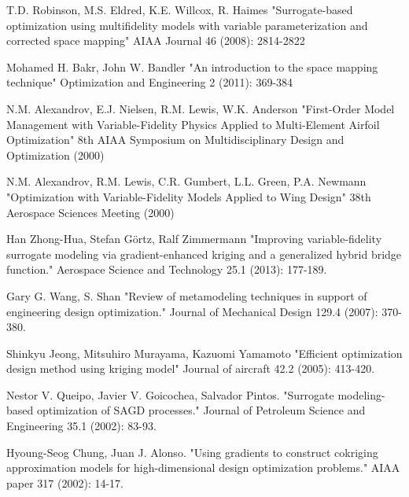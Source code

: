 \documentclass[a4paper,onecolumn]{article}
\theoremstyle{remark}
\begin{document}
\begin{thebibliography}{9}
T.D. Robinson, M.S. Eldred, K.E. Willcox, R. Haimes
"Surrogate-based optimization using multifidelity models with variable 
parameterization and corrected space mapping"
AIAA Journal 46 (2008): 2814-2822

Mohamed H. Bakr, John W. Bandler
"An introduction to the space mapping technique"
Optimization and Engineering 2 (2011): 369-384

N.M. Alexandrov, E.J. Nielsen, R.M. Lewis, W.K. Anderson
"First-Order Model Management with Variable-Fidelity Physics 
Applied to Multi-Element Airfoil Optimization"
8th AIAA Symposium on Multidisciplinary Design and Optimization (2000)


N.M. Alexandrov, R.M. Lewis, C.R. Gumbert, L.L. Green, P.A. Newmann
"Optimization with Variable-Fidelity Models Applied to Wing Design"
38th Aerospace Sciences Meeting (2000)

Han Zhong-Hua, Stefan Görtz, Ralf Zimmermann
"Improving variable-fidelity surrogate modeling via gradient-enhanced kriging and a generalized hybrid bridge function."
Aerospace Science and Technology 25.1 (2013): 177-189.

Gary G. Wang, S. Shan
"Review of metamodeling techniques in support of engineering design optimization."
Journal of Mechanical Design 129.4 (2007): 370-380.

Shinkyu Jeong, Mitsuhiro Murayama, Kazuomi Yamamoto
"Efficient optimization design method using kriging model" 
Journal of aircraft 42.2 (2005): 413-420.

Nestor V. Queipo, Javier V. Goicochea, Salvador Pintos. 
"Surrogate modeling-based optimization of SAGD processes." 
Journal of Petroleum Science and Engineering 35.1 (2002): 83-93.

Hyoung-Seog Chung, Juan J. Alonso. 
"Using gradients to construct cokriging approximation models for high-dimensional design optimization problems." 
AIAA paper 317 (2002): 14-17.


\end{thebibliography}
\end{document}
